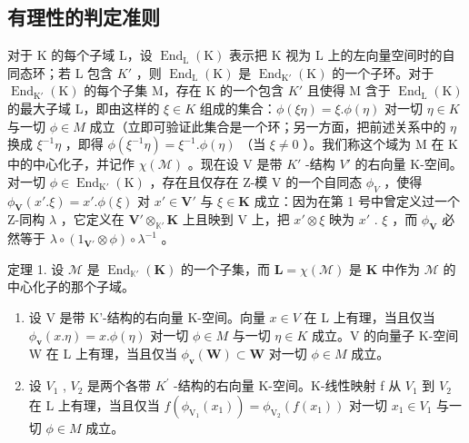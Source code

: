\subsection{有理性的判定准则}

对于 K 的每个子域 L，设 \(\operatorname{End}_{\mathrm{L}}(\mathrm{K})\) 表示把 K 视为 L 上的左向量空间时的自同态环；若 L 包含 \(K'\) ，则 \(\operatorname{End}_{\mathrm{L}}(\mathrm{K})\) 是 \(\operatorname{End}_{\mathrm{K}'}(\mathrm{K})\) 的一个子环。对于 \(\operatorname{End}_{\mathrm{K}'}(\mathrm{K})\) 的每个子集 M，存在 K 的一个包含 \(K'\) 且使得 M 含于 \(\operatorname{End}_{\mathrm{L}}(\mathrm{K})\) 的最大子域 L，即由这样的 \(\xi \in K\) 组成的集合：\(\phi(\xi\eta) = \xi.\phi(\eta)\) 对一切 \(\eta \in K\) 与一切 \(\phi \in M\) 成立（立即可验证此集合是一个环；另一方面，把前述关系中的 \(\eta\) 换成 \(\xi^{-1}\eta\) ，即得 \(\phi(\xi^{-1}\eta) = \xi^{-1}.\phi(\eta)\) （当 \(\xi \neq 0\) ）。我们称这个域为 M 在 K 中的中心化子，并记作 \(\chi(\mathcal{M})\) 。现在设 V 是带 \(K'\) -结构 \(V'\) 的右向量 K-空间。对一切 \(\phi \in \operatorname{End}_{\mathrm{K}'}(\mathrm{K})\) ，存在且仅存在 Z-模 V 的一个自同态 \(\phi_{V}\) ，使得 \(\phi_{\mathbf{V}}(x'.\xi) = x'.\phi(\xi)\) 对 \(x' \in \mathbf{V}'\) 与 \(\xi \in \mathbf{K}\) 成立：因为在第 1 号中曾定义过一个 Z-同构 \(\lambda\) ，它定义在 \(\mathbf{V}' \otimes_{\mathbb{K}'} \mathbf{K}\) 上且映到 V 上，把 \(x' \otimes \xi\) 映为 \(x'\) . \(\xi\) ，而 \(\phi_{\mathbf{V}}\) 必然等于 \(\lambda \circ (1_{\mathbf{V}'} \otimes \phi) \circ \lambda^{-1}\) 。

定理 1. 设 \(\mathcal{M}\) 是 \(\operatorname{End}_{\mathbb{K}'}(\mathbf{K})\) 的一个子集，而 \(\mathbf{L} = \chi(\mathcal{M})\) 是 \(\mathbf{K}\) 中作为 \(\mathcal{M}\) 的中心化子的那个子域。

\begin{enumerate}
\def\labelenumi{(\roman{enumi})}
\item
  设 V 是带 K'-结构的右向量 K-空间。向量 \(x \in V\) 在 L 上有理，当且仅当 \(\phi_{\mathbf{v}}(x.\eta) = x.\phi(\eta)\) 对一切 \(\phi \in M\) 与一切 \(\eta \in K\) 成立。V 的向量子 K-空间 W 在 L 上有理，当且仅当 \(\phi_{\mathbf{v}}(\mathbf{W}) \subset \mathbf{W}\) 对一切 \(\phi \in M\) 成立。
\item
  设 \(V_{1}\) , \(V_{2}\) 是两个各带 \(K^{\prime}\) -结构的右向量 K-空间。K-线性映射 f 从 \(V_{1}\) 到 \(V_{2}\) 在 L 上有理，当且仅当 \(f(\phi_{\mathrm{V}_{1}}(x_{1})) = \phi_{\mathrm{V}_{2}}(f(x_{1}))\) 对一切 \(x_{1} \in V_{1}\) 与一切 \(\phi \in M\) 成立。
\end{enumerate}

